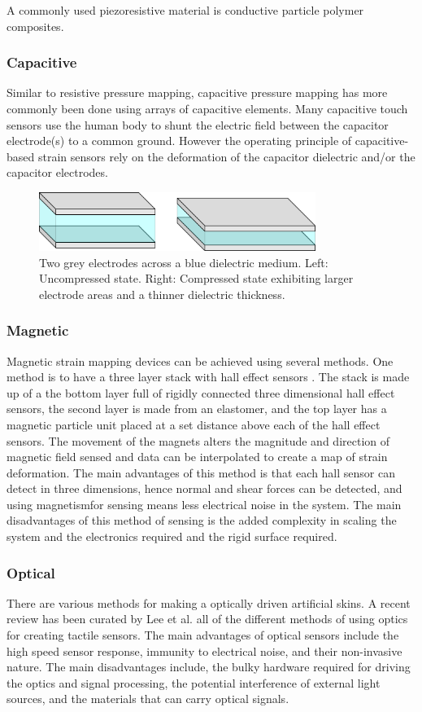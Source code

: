 A commonly used piezoresistive material is conductive particle polymer composites. 

\subsubsection{Capacitive}
Similar to resistive pressure mapping, capacitive pressure mapping has more commonly been done using arrays of capacitive elements. Many capacitive touch sensors use the human body to shunt the electric field between the capacitor electrode(s) to a common ground. However the operating principle of capacitive-based strain sensors rely on the deformation of the capacitor dielectric and/or the capacitor electrodes. 
\begin{figure}[H]
	\centering
	\includegraphics[width=9cm]{Figures/cap_deformed_states_x2_crop.png}
	\caption{Two grey electrodes across a blue dielectric medium. Left: Uncompressed state. Right: Compressed state exhibiting larger electrode areas and a thinner dielectric thickness.}
	\label{fig:cap_deformed_cube}
\end{figure}

\subsubsection{Magnetic}
Magnetic strain mapping devices can be achieved using several methods. One method is to have a three layer stack with hall effect sensors \cite{Yan2021}. The stack is made up of a the bottom layer full of rigidly connected three dimensional hall effect sensors, the second layer is made from an elastomer, and the top layer has a magnetic particle unit placed at a set distance above each of the hall effect sensors. The movement of the magnets alters the magnitude and direction of magnetic field sensed and data can be interpolated to create a map of strain deformation. The main advantages of this method is that each hall sensor can detect in three dimensions, hence normal and shear forces can be detected, and using magnetismfor sensing means less electrical noise in the system. The main disadvantages of this method of sensing is the added complexity in scaling the system and the electronics required and the rigid surface required.  

\subsubsection{Optical}
There are various methods for making a optically driven artificial skins. A recent review has been curated by Lee et al. \cite{Lee2023} all of the different methods of using optics for creating tactile sensors. The main advantages of optical sensors include the high speed sensor response, immunity to electrical noise, and their non-invasive nature. The main disadvantages include, the bulky hardware required for driving the optics and signal processing, the potential interference of external light sources, and the materials that can carry optical signals. 

